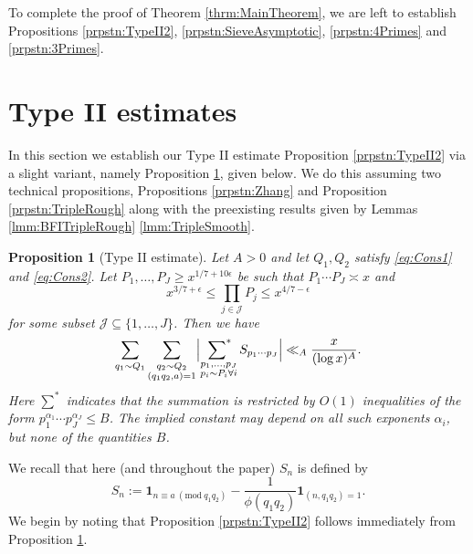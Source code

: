 \documentclass[10pt]{amsart}
\theoremstyle{plain}
\newtheorem{prpstn}[thrm]{Proposition}
\numberwithin{equation}{section}
\newcommand{\Mod}[1]{\ (\mathrm{mod}\ #1)}
\begin{document}
%
%
%
%
%
%
%
%
To complete the proof of Theorem \ref{thrm:MainTheorem}, we are left to establish Propositions \ref{prpstn:TypeII2}, \ref{prpstn:SieveAsymptotic}, \ref{prpstn:4Primes} and  \ref{prpstn:3Primes}.
%
%
%
%
%
%
%
%
%
%
%
%
%
%
%
%
%
%
\section{Type II estimates}\label{sec:TypeII}
%
%
%
%
In this section we establish our Type II estimate Proposition \ref{prpstn:TypeII2} via a slight variant, namely Proposition \ref{prpstn:TypeII}, given below. We do this assuming two technical propositions, Propositions \ref{prpstn:Zhang} and Proposition \ref{prpstn:TripleRough} along with the preexisting results given by Lemmas \ref{lmm:BFITripleRough} \ref{lmm:TripleSmooth}.
%
%
%
%
%
%
%
%
\begin{prpstn}[Type II estimate]\label{prpstn:TypeII}
Let $A>0$ and let $Q_1,Q_2 $ satisfy \eqref{eq:Cons1} and \eqref{eq:Cons2}. Let $P_1,\dots, P_J\ge x^{1/7+10\epsilon}$ be such that $P_1\cdots P_J\asymp x$ and
\[
x^{3/7+\epsilon}\le\prod_{j\in\mathcal{J}}P_j\le x^{4/7-\epsilon}
\]
for some subset $\mathcal{J}\subseteq\{1,\dots,J\}$. Then we have 
\[
\sum_{q_1\sim Q_1}\sum_{\substack{q_2\sim Q_2\\ (q_1q_2,a)=1}}\Bigl|\mathop{\sideset{}{^*}\sum}_{\substack{p_1,\dots,p_J\\ p_i\sim P_i\forall i}}S_{p_1\cdots p_J}\Bigr|\ll_{A}\frac{x}{(\log{x})^A}.
\]
Here $\sum^*$ indicates that the summation is restricted by $O(1)$ inequalities of the form $p_1^{\alpha_1}\cdots p_J^{\alpha_J}\le B$. The implied constant may depend on all such exponents $\alpha_i$, but none of the quantities $B$.
\end{prpstn}
%
%
%
%
%
%
%
%
We recall that here (and throughout the paper) $S_n$ is defined by
\[
S_n:=\mathbf{1}_{n\equiv a\Mod{q_1q_2}}-\frac{1}{\phi(q_1q_2)}\mathbf{1}_{(n,q_1q_2)=1}.
\]
We begin by noting that Proposition \ref{prpstn:TypeII2} follows immediately from Proposition \ref{prpstn:TypeII}.
\end{document}
